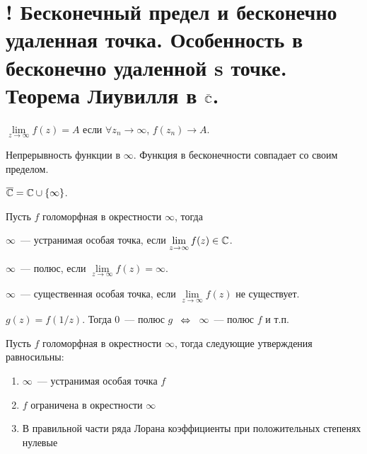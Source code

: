 \section{! Бесконечный предел и бесконечно удаленная точка. Особенность в бесконечно удаленной s точке. Теорема Лиувилля в $\bar{\mathbb{C}}$.}

\begin{definition}
    $\lim\limits_{z\to\infty} f(z) = A$
    если $\forall z_n \to \infty$, $f(z_n) \to A$.
\end{definition}

\begin{definition}
    Непрерывность функции в $\infty$.
    Функция в бесконечности совпадает со своим пределом.
\end{definition}

\begin{notation}
    $\overline{\mathbb{C}} = \mathbb{C} \cup \left\{\infty\right\}$.
\end{notation}

\begin{definition}
    Пусть $f$ голоморфная в окрестности $\infty$, тогда

    $\infty$~--- устранимая особая точка, если
    $\lim\limits_{z\to\infty} f(z) \in \mathbb{C}$.

    $\infty$~--- полюс, если
    $\lim\limits_{z\to\infty} f(z) = \infty$.

    $\infty$~--- существенная особая точка, если
    $\lim\limits_{z\to\infty} f(z)$ не существует.
\end{definition}

\begin{observation}
    $g(z) = f(1/z)$. Тогда $0$~--- полюс $g$
    $\; \, \Leftrightarrow \; \,$ $\infty$~--- полюс $f$ и т.п.
\end{observation}

\begin{observation}
    Пусть $f$ голоморфная в окрестности $\infty$, тогда
    следующие утверждения равносильны:

    \begin{enumerate}
        \item $\infty$~--- устранимая особая точка $f$
        \item $f$ ограничена в окрестности $\infty$
        \item В правильной части ряда Лорана
              коэффициенты при положительных степенях нулевые
    \end{enumerate}
\end{observation}

